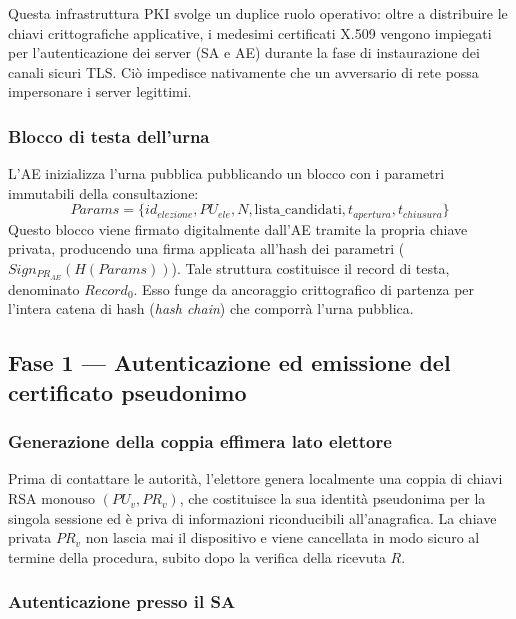 Questa infrastruttura PKI svolge un duplice ruolo operativo: oltre a distribuire le chiavi crittografiche applicative, i medesimi certificati X.509 vengono impiegati per l'autenticazione dei server (SA e AE) durante la fase di instaurazione dei canali sicuri TLS. Ciò impedisce nativamente che un avversario di rete possa impersonare i server legittimi.

\subsubsection{Blocco di testa dell'urna}
\label{subsubsec:wp2_blocco_testa}

L'AE inizializza l'urna pubblica pubblicando un blocco con i parametri immutabili della consultazione:
$$Params = \{ id_{elezione}, PU_{ele}, N, \text{lista\_candidati}, t_{apertura}, t_{chiusura} \}$$
Questo blocco viene firmato digitalmente dall'AE tramite la propria chiave privata, producendo una firma applicata all'hash dei parametri ($Sign_{PR_{AE}}(H(Params))$). Tale struttura costituisce il record di testa, denominato $Record_0$. Esso funge da ancoraggio crittografico di partenza per l'intera catena di hash (\textit{hash chain}) che comporrà l'urna pubblica.

\subsection{Fase 1 --- Autenticazione ed emissione del certificato pseudonimo}
\label{subsec:wp2_fase_autenticazione}

\subsubsection{Generazione della coppia effimera lato elettore}
\label{subsubsec:wp2_chiave_effimera}

Prima di contattare le autorità, l'elettore genera localmente una coppia di chiavi RSA monouso $(PU_v, PR_v)$, che costituisce la sua identità pseudonima per la singola sessione ed è priva di informazioni riconducibili all'anagrafica. La chiave privata $PR_v$ non lascia mai il dispositivo e viene cancellata in modo sicuro al termine della procedura, subito dopo la verifica della ricevuta $R$.

\subsubsection{Autenticazione presso il SA}
\label{subsubsec:wp2_autenticazione_sa}

